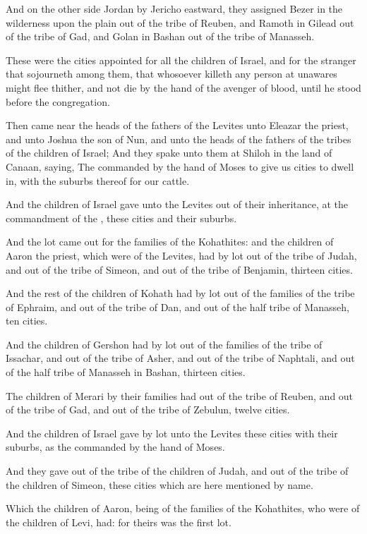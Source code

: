 \Verse And on the other side Jordan by Jericho eastward, they assigned Bezer in the wilderness upon the plain out of the tribe of Reuben, and Ramoth in Gilead out of the tribe of Gad, and Golan in Bashan out of the tribe of Manasseh.

\Verse These were the cities appointed for all the children of Israel, and for the stranger that sojourneth among them, that whosoever killeth any person at unawares might flee thither, and not die by the hand of the avenger of blood, until he stood before the congregation.


\Chapter
\Verse Then came near the heads of the fathers of the Levites unto Eleazar the priest, and unto Joshua the son of Nun, and unto the heads of the fathers of the tribes of the children of Israel; \Verse And they spake unto them at Shiloh in the land of Canaan, saying, The \LORD commanded by the hand of Moses to give us cities to dwell in, with the suburbs thereof for our cattle.

\Verse And the children of Israel gave unto the Levites out of their inheritance, at the commandment of the \LORD, these cities and their suburbs.

\Verse And the lot came out for the families of the Kohathites: and the children of Aaron the priest, which were of the Levites, had by lot out of the tribe of Judah, and out of the tribe of Simeon, and out of the tribe of Benjamin, thirteen cities.

\Verse And the rest of the children of Kohath had by lot out of the families of the tribe of Ephraim, and out of the tribe of Dan, and out of the half tribe of Manasseh, ten cities.

\Verse And the children of Gershon had by lot out of the families of the tribe of Issachar, and out of the tribe of Asher, and out of the tribe of Naphtali, and out of the half tribe of Manasseh in Bashan, thirteen cities.

\Verse The children of Merari by their families had out of the tribe of Reuben, and out of the tribe of Gad, and out of the tribe of Zebulun, twelve cities.

\Verse And the children of Israel gave by lot unto the Levites these cities with their suburbs, as the \LORD commanded by the hand of Moses.

\Verse And they gave out of the tribe of the children of Judah, and out of the tribe of the children of Simeon, these cities which are here mentioned by name.

\Verse Which the children of Aaron, being of the families of the Kohathites, who were of the children of Levi, had: for theirs was the first lot.

